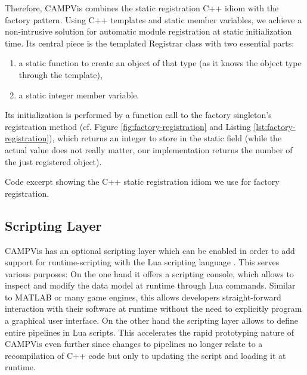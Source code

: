 Therefore, CAMPVis combines the static registration C++ idiom with the factory pattern.
Using C++ templates and static member variables, we achieve a non-intrusive solution for automatic module registration at static initialization time.
Its central piece is the templated Registrar class with two essential parts:
\begin{enumerate}
	\item a static function to create an object of that type (as it knows the object type through the template),
	\item a static integer member variable.
\end{enumerate}
Its initialization is performed by a function call to the factory singleton's registration method (cf. Figure \ref{fig:factory-registration} and Listing \ref{lst:factory-registration}), which returns an integer to store in the static field (while the actual value does not really matter, our implementation returns the number of the just registered object).

\begin{listing}[hbt]
	\caption{Code excerpt showing the C++ static registration idiom we use for factory registration.}
	\label{lst:factory-registration}
\end{listing}



\subsection{Scripting Layer}


CAMPVis has an optional scripting layer which can be enabled in order to add support for runtime-scripting with the Lua scripting language \cite{lua}.
This serves various purposes:
On the one hand it offers a scripting console, which allows to inspect and modify the data model at runtime through Lua commands.
Similar to MATLAB \cite{matlab} or many game engines, this allows developers straight-forward interaction with their software at runtime without the need to explicitly program a graphical user interface.
On the other hand the scripting layer allows to define entire pipelines in Lua scripts.
This accelerates the rapid prototyping nature of CAMPVis even further since changes to pipelines no longer relate to a recompilation of C++ code but only to updating the script and loading it at runtime.

